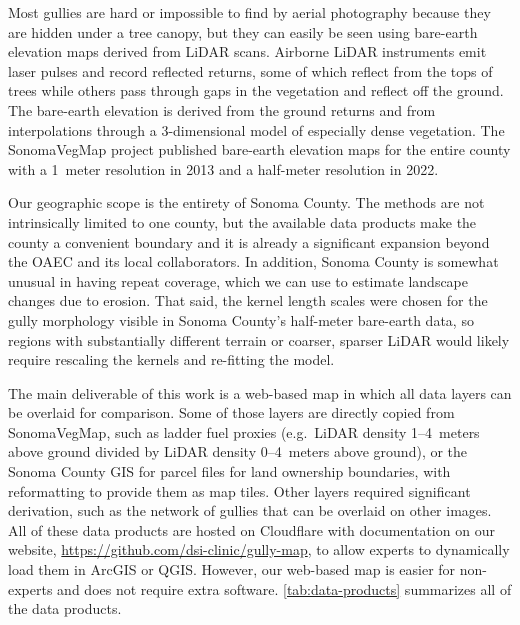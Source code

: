 Most gullies are hard or impossible to find by aerial photography because they are hidden under a tree canopy, but they can easily be seen using bare-earth elevation maps derived from LiDAR scans. Airborne LiDAR instruments emit laser pulses and record reflected returns, some of which reflect from the tops of trees while others pass through gaps in the vegetation and reflect off the ground. The bare-earth elevation is derived from the ground returns and from interpolations through a 3-dimensional model of especially dense vegetation. The SonomaVegMap project published bare-earth elevation maps for the entire county with a 1~meter resolution in 2013 and a half-meter resolution in 2022.

Our geographic scope is the entirety of Sonoma County. The methods are not intrinsically limited to one county, but the available data products make the county a convenient boundary and it is already a significant expansion beyond the OAEC and its local collaborators. In addition, Sonoma County is somewhat unusual in having repeat coverage, which we can use to estimate landscape changes due to erosion. That said, the kernel length scales were chosen for the gully morphology visible in Sonoma County's half-meter bare-earth data, so regions with substantially different terrain or coarser, sparser LiDAR would likely require rescaling the kernels and re-fitting the model.

The main deliverable of this work is a web-based map in which all data layers can be overlaid for comparison. Some of those layers are directly copied from SonomaVegMap, such as ladder fuel proxies (e.g.\ LiDAR density 1--4~meters above ground divided by LiDAR density 0--4~meters above ground), or the Sonoma County GIS for parcel files for land ownership boundaries, with reformatting to provide them as map tiles. Other layers required significant derivation, such as the network of gullies that can be overlaid on other images. All of these data products are hosted on Cloudflare with documentation on our website, {\small \url{https://github.com/dsi-clinic/gully-map}}, to allow experts to dynamically load them in ArcGIS or QGIS. However, our web-based map is easier for non-experts and does not require extra software. \cref{tab:data-products} summarizes all of the data products.

